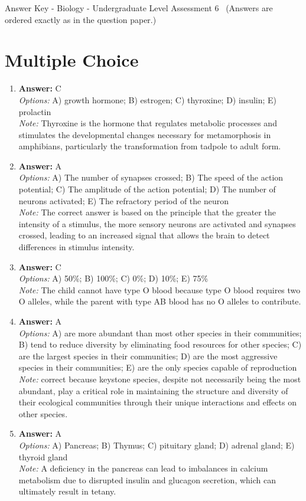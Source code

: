 \documentclass[12pt]{article}
\begin{document}
\begin{center}
Answer Key - Biology - Undergraduate Level Assessment 6 \
\small (Answers are ordered exactly as in the question paper.)
\end{center}

\section*{Multiple Choice}
\begin{enumerate}[label=\arabic*.]
\item \textbf{Answer:} C
\\ \textit{Options:} A) growth hormone; B) estrogen; C) thyroxine; D) insulin; E) prolactin
\\ \textit{Note:} Thyroxine is the hormone that regulates metabolic processes and stimulates the developmental changes necessary for metamorphosis in amphibians, particularly the transformation from tadpole to adult form.
\item \textbf{Answer:} A
\\ \textit{Options:} A) The number of synapses crossed; B) The speed of the action potential; C) The amplitude of the action potential; D) The number of neurons activated; E) The refractory period of the neuron
\\ \textit{Note:} The correct answer is based on the principle that the greater the intensity of a stimulus, the more sensory neurons are activated and synapses crossed, leading to an increased signal that allows the brain to detect differences in stimulus intensity.
\item \textbf{Answer:} C
\\ \textit{Options:} A) 50\%; B) 100\%; C) 0\%; D) 10\%; E) 75\%
\\ \textit{Note:} The child cannot have type O blood because type O blood requires two O alleles, while the parent with type AB blood has no O alleles to contribute.
\item \textbf{Answer:} A
\\ \textit{Options:} A) are more abundant than most other species in their communities; B) tend to reduce diversity by eliminating food resources for other species; C) are the largest species in their communities; D) are the most aggressive species in their communities; E) are the only species capable of reproduction
\\ \textit{Note:} correct because keystone species, despite not necessarily being the most abundant, play a critical role in maintaining the structure and diversity of their ecological communities through their unique interactions and effects on other species.
\item \textbf{Answer:} A
\\ \textit{Options:} A) Pancreas; B) Thymus; C) pituitary gland; D) adrenal gland; E) thyroid gland
\\ \textit{Note:} A deficiency in the pancreas can lead to imbalances in calcium metabolism due to disrupted insulin and glucagon secretion, which can ultimately result in tetany.
\end{enumerate}
\end{document}
